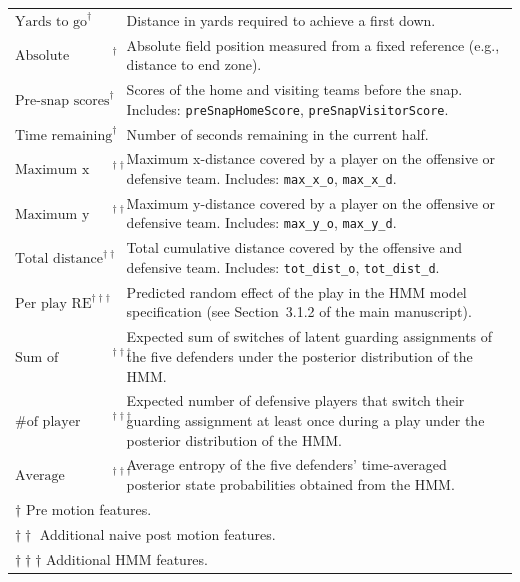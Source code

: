 \documentclass[namedate,webpdf,modern,medium]{oup-authoring-template}
\begin{document}
\begin{table}[ht]
{\begin{tabular}{p{5cm} p{10cm}}
$\text{Yards to go}^{\dagger}$ &
Distance in yards required to achieve a first down. \\

$\text{Absolute yardline}^{\dagger}$ &
Absolute field position measured from a fixed reference (e.g., distance to end zone). \\

$\text{Pre-snap scores}^{\dagger}$ &
Scores of the home and visiting teams before the snap.
Includes:
\texttt{preSnapHomeScore},
\texttt{preSnapVisitorScore}. \\

$\text{Time remaining}^{\dagger}$ &
Number of seconds remaining in the current half. \\

\hline 

$\text{Maximum x distance}^{\dagger\dagger}$ &
Maximum x-distance covered by a player on the offensive or defensive team.
Includes:
\texttt{max\_x\_o},
\texttt{max\_x\_d}. \\

$\text{Maximum y distance}^{\dagger\dagger}$ &
Maximum y-distance covered by a player on the offensive or defensive team.
Includes:
\texttt{max\_y\_o},
\texttt{max\_y\_d}. \\

$\text{Total distance}^{\dagger\dagger}$ &
Total cumulative distance covered by the offensive and defensive team.
Includes:
\texttt{tot\_dist\_o},
\texttt{tot\_dist\_d}. \\

\hline 
$\text{Per play RE}^{\dagger\dagger\dagger}$ &
Predicted random effect of the play in the HMM model specification (see Section~3.1.2 of the main manuscript). \\

$\text{Sum of switches}^{\dagger\dagger\dagger}$ &
Expected sum of switches of latent guarding assignments of the five defenders under the posterior distribution of the HMM. \\

$\text{\# of player changes}^{\dagger\dagger\dagger}$ &
Expected number of defensive players that switch their guarding assignment at least once during a play under the posterior distribution of the HMM. \\

$\text{Average entropy}^{\dagger\dagger\dagger}$ &
Average entropy of the five defenders' time-averaged posterior state probabilities obtained from the HMM. \\

\hline
\hline
\multicolumn{2}{l}{$\dagger$ Pre motion features.} \\
\multicolumn{2}{l}{$\dagger\dagger$ Additional naive post motion features.} \\
\multicolumn{2}{l}{$\dagger\dagger\dagger$ Additional HMM features.}
\end{tabular}
}
\end{table}
\end{document}
